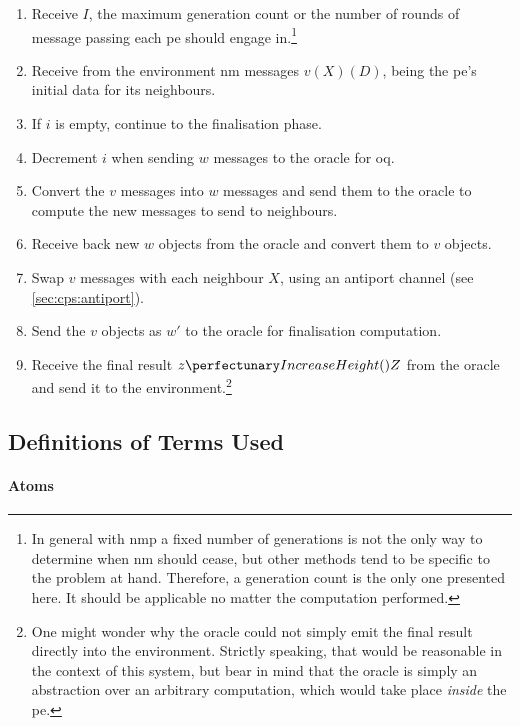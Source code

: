 \begin{enumerate}
    \item Receive \(I\), the maximum generation count or the number of rounds of message passing each \gls{pe} should engage in.\footnote{In general with \gls{nmp} a fixed number of generations is not the only way to determine when \gls{nm} should cease, but other methods tend to be specific to the problem at hand.   Therefore, a generation count is the only one presented here.  It should be applicable no matter the computation performed.}
    \item Receive from the environment \gls{nm} messages \(v(X)(D)\), being the \gls{pe}'s initial data for its neighbours.
    \item If \(i\) is empty, continue to the finalisation phase.
    \item Decrement \(i\) when sending \(w\) messages to the oracle for \gls{oq}.
    \item Convert the \(v\) messages into \(w\) messages and send them to the oracle to compute the new messages to send to neighbours.
    \item Receive back new \(w\) objects from the oracle and convert them to \(v\) objects.
    \item Swap \(v\) messages with each neighbour \(X\), using an antiport channel (see \cref{sec:cps:antiport}).
    \item Send the \(v\) objects as \(w'\) to the oracle for finalisation computation.
    \item Receive the final result \(\cpfunc{z}{Z}\) from the oracle and send it to the environment.\footnote{One might wonder why the oracle could not simply emit the final result directly into the environment.  Strictly speaking, that would be reasonable in the context of this system, but bear in mind that the oracle is simply an abstraction over an arbitrary computation, which would take place \emph{inside} the \gls{pe}.}
\end{enumerate}

\subsection{\label{sec:nmp:systemwide:definitions}Definitions of Terms Used}

\paragraph{Atoms}
\begin{description}
\end{description}

